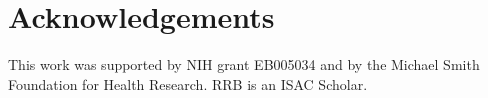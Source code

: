 \documentclass[12pt]{article}
\begin{document}
\section*{Acknowledgements}
This work was supported by NIH grant EB005034 and by the Michael Smith
Foundation for Health Research. RRB is an ISAC Scholar.

  
 
\end{document}
